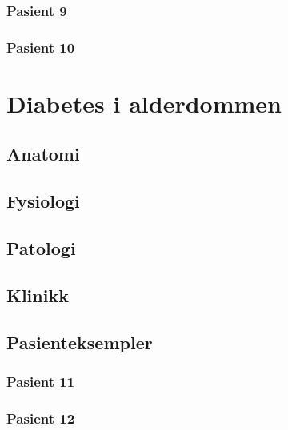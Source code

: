 \documentclass[a4paper,12pt,twoside]{memoir}
\begin{document}
			\subsection{Pasient 9}
			\subsection{Pasient 10}
	\chapter{Diabetes i alderdommen}
		\section{Anatomi}
		\section{Fysiologi}
		\section{Patologi}
		\section{Klinikk}
		\section{Pasienteksempler}
			\subsection{Pasient 11}
			\subsection{Pasient 12}

 

 \renewcommand{\bibname}{Kilder:}
            {}
			
\end{document}
